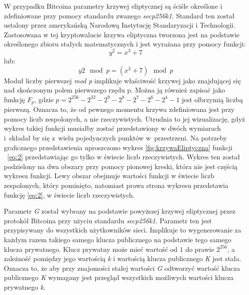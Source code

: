 \documentclass[12pt, twoside, final, openany]{mgr}
\begin{document}
\indent W przypadku Bitcoina parametry krzywej eliptycznej są ściśle określone i zdefiniowane przy pomocy standardu zwanego \textit{secp256k1}. Standard ten został ustalony przez amerykańską Narodową Instytucję Standaryzacji i Technologii. Zastosowana w tej kryptowalucie krzywa eliptyczna tworzona jest na podstawie określonego zbioru stałych matematycznych i jest wyrażana przy pomocy funkcji:
\begin{equation}
  y^2 = x^3 + 7 
\end{equation} 
\label{eq:2}
lub:
\begin{equation} 
\label{eq:3}
  y2 \mod p = (x^3 + 7) \mod p
\end{equation}
Moduł liczby pierwszej \textit{mod p} implikuje właściwość krzywej jako znajdującej się nad skończonym polem pierwszego rzędu p. Można ją również zapisać jako funkcję $F_p$, gdzie $p = 2^{256} - 2^{32} - 2^9 - 2^8 - 2^7 - 2^6 - 2^4 - 1$ jest olbrzymią liczbą pierwszą. Oznacza to, że od pewnego momentu krzywa zdefiniowana jest przy pomocy liczb zespolonych, a nie rzeczywistych. Utrudnia to jej wizualizację, gdyż wykres takiej funkcji musiałby zostać przedstawiony w dwóch wymiarach i~składał by się z~wielu pojedynczych punktów w~przestrzeni. Na potrzeby graficznego przedstawienia uproszczono wykres \ref{fig:krzywaEliptyczna} funkcji ~\ref{eq:2} przedstawiając go tylko w świecie liczb rzeczywistych. Wykres ten został podzielony na dwa obszary przy pomocy pionowej kreski, która nie jest częścią wykresu funkcji. Lewy obszar obejmuje wartości funkcji w świecie liczb zespolonych, który pominięto, natomiast prawa strona wykresu przedstawia funkcję \ref{eq:2}, w świecie liczb rzeczywistych.

\indent Parametr \textit{G} został wybrany na podstawie powyższej krzywej eliptycznej przez protokół Bitcoina przy użyciu standardu \textit{secp256k1}. Parametr ten jest przypisywany do wszystkich użytkowników sieci. Implikuje to wygenerowanie za każdym razem takiego samego klucza publicznego na podstawie tego samego klucza prywatnego. Klucz prywatny może mieć wartość od $1$ do prawie $2^{256}$, a zależność pomiędzy jego wartością \textit{k} i wartością klucza publicznego \textit{K} jest stała. Oznacza to, że aby przy znajomości stałej wartości \textit{G} odtworzyć wartość klucza publicznego \textit{K} wymagany jest przegląd wszystkich możliwych wartości klucza prywatnego \textit{k}. 
\end{document}
